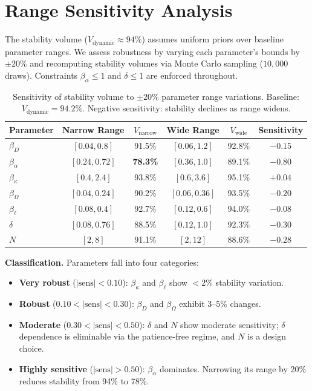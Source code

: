 \documentclass[11pt]{article}
\begin{document}

\section{Range Sensitivity Analysis}
\label{sec:S7}

The stability volume ($V_{\text{dynamic}} \approx 94\%$) assumes uniform priors over baseline parameter ranges. We assess robustness by varying each parameter's bounds by $\pm 20\%$ and recomputing stability volumes via Monte Carlo sampling ($10{,}000$ draws). Constraints $\beta_\alpha \leq 1$ and $\delta \leq 1$ are enforced throughout.

\begin{table}[h]
\caption{Sensitivity of stability volume to $\pm 20\%$ parameter range variations. Baseline: $V_{\text{dynamic}} = 94.2\%$. Negative sensitivity: stability declines as range widens.}
\label{tab:range_sensitivity}
\centering
\small
\begin{tabular}{lccccc}
\toprule
\textbf{Parameter} & \textbf{Narrow Range} & $V_{\text{narrow}}$ & \textbf{Wide Range} & $V_{\text{wide}}$ & \textbf{Sensitivity} \\
\midrule
$\beta_D$ & $[0.04, 0.8]$ & 91.5\% & $[0.06, 1.2]$ & 92.8\% & $-0.15$ \\
$\beta_\alpha$ & $[0.24, 0.72]$ & \textbf{78.3\%} & $[0.36, 1.0]$ & 89.1\% & $\mathbf{-0.80}$ \\
$\beta_\kappa$ & $[0.4, 2.4]$ & 93.8\% & $[0.6, 3.6]$ & 95.1\% & $+0.04$ \\
$\beta_\Omega$ & $[0.04, 0.24]$ & 90.2\% & $[0.06, 0.36]$ & 93.5\% & $-0.20$ \\
$\beta_\ell$ & $[0.08, 0.4]$ & 92.7\% & $[0.12, 0.6]$ & 94.0\% & $-0.08$ \\
$\delta$ & $[0.08, 0.76]$ & 88.5\% & $[0.12, 1.0]$ & 92.3\% & $-0.30$ \\
$N$ & $[2, 8]$ & 91.1\% & $[2, 12]$ & 88.6\% & $-0.28$ \\
\bottomrule
\end{tabular}
\end{table}

\textbf{Classification.} Parameters fall into four categories:
\begin{itemize}
\item \textbf{Very robust} ($|\text{sens}| < 0.10$): $\beta_\kappa$ and $\beta_\ell$ show $<2\%$ stability variation.
\item \textbf{Robust} ($0.10 < |\text{sens}| < 0.30$): $\beta_D$ and $\beta_\Omega$ exhibit 3--5\% changes.
\item \textbf{Moderate} ($0.30 < |\text{sens}| < 0.50$): $\delta$ and $N$ show moderate sensitivity; $\delta$ dependence is eliminable via the patience-free regime, and $N$ is a design choice.
\item \textbf{Highly sensitive} ($|\text{sens}| > 0.50$): $\beta_\alpha$ dominates. Narrowing its range by 20\% reduces stability from 94\% to 78\%.
\end{itemize}
\end{document}
